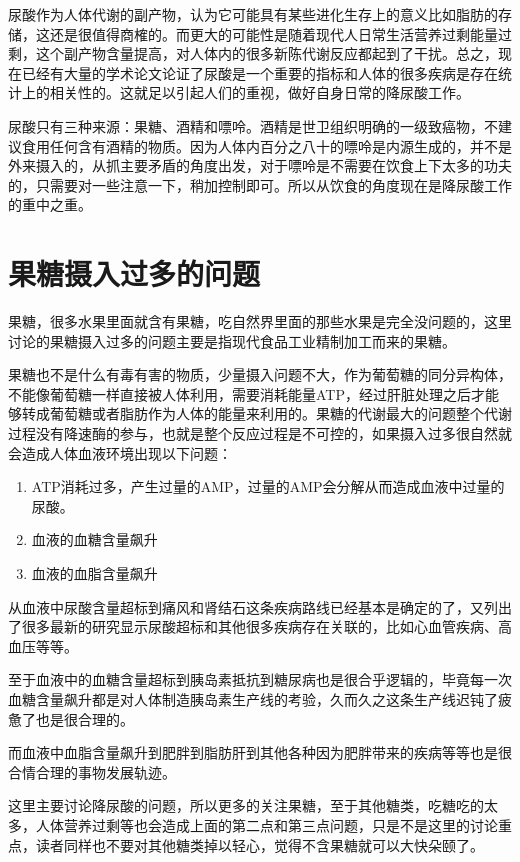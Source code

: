 \documentclass[12pt,oneside]{book}
\begin{document}
尿酸作为人体代谢的副产物，认为它可能具有某些进化生存上的意义比如脂肪的存储，这还是很值得商榷的。而更大的可能性是随着现代人日常生活营养过剩能量过剩，这个副产物含量提高，对人体内的很多新陈代谢反应都起到了干扰。总之，现在已经有大量的学术论文论证了尿酸是一个重要的指标和人体的很多疾病是存在统计上的相关性的。这就足以引起人们的重视，做好自身日常的降尿酸工作。

尿酸只有三种来源：果糖、酒精和嘌呤。酒精是世卫组织明确的一级致癌物，不建议食用任何含有酒精的物质。因为人体内百分之八十的嘌呤是内源生成的，并不是外来摄入的，从抓主要矛盾的角度出发，对于嘌呤是不需要在饮食上下太多的功夫的，只需要对一些注意一下，稍加控制即可。所以从饮食的角度现在是降尿酸工作的重中之重。



\section{果糖摄入过多的问题}
果糖，很多水果里面就含有果糖，吃自然界里面的那些水果是完全没问题的，这里讨论的果糖摄入过多的问题主要是指现代食品工业精制加工而来的果糖。

果糖也不是什么有毒有害的物质，少量摄入问题不大，作为葡萄糖的同分异构体，不能像葡萄糖一样直接被人体利用，需要消耗能量ATP，经过肝脏处理之后才能够转成葡萄糖或者脂肪作为人体的能量来利用的。果糖的代谢最大的问题整个代谢过程没有降速酶的参与，也就是整个反应过程是不可控的，如果摄入过多很自然就会造成人体血液环境出现以下问题：

\begin{enumerate}
\item ATP消耗过多，产生过量的AMP，过量的AMP会分解从而造成血液中过量的尿酸。
\item 血液的血糖含量飙升
\item 血液的血脂含量飙升
\end{enumerate}

从血液中尿酸含量超标到痛风和肾结石这条疾病路线已经基本是确定的了，\cite{疯狂的尿酸}又列出了很多最新的研究显示尿酸超标和其他很多疾病存在关联的，比如心血管疾病、高血压等等。

至于血液中的血糖含量超标到胰岛素抵抗到糖尿病也是很合乎逻辑的，毕竟每一次血糖含量飙升都是对人体制造胰岛素生产线的考验，久而久之这条生产线迟钝了疲惫了也是很合理的。

而血液中血脂含量飙升到肥胖到脂肪肝到其他各种因为肥胖带来的疾病等等也是很合情合理的事物发展轨迹。

这里主要讨论降尿酸的问题，所以更多的关注果糖，至于其他糖类，吃糖吃的太多，人体营养过剩等也会造成上面的第二点和第三点问题，只是不是这里的讨论重点，读者同样也不要对其他糖类掉以轻心，觉得不含果糖就可以大快朵颐了。
\end{document}

